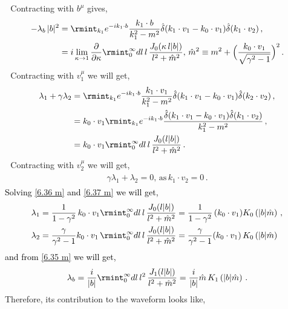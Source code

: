 \textbullet $\,\,$ Contracting with $b^\mu$ gives,
\begin{align}
    \begin{split}
        -\lambda_b \,|b|^2&=\rmint_{k_1} e^{-i k_1\cdot b} \frac{k_1\cdot b}{k_1^2-m^2}\hat\delta(k_1\cdot v_1-k_0\cdot v_1)\hat\delta(k_1\cdot v_2)\,,\\ &
        =i\lim_{\kappa\to 1}\frac{\partial}{\partial \kappa}\rmint_{0}^\infty dl\,l\,\frac{J_{0}(\kappa\,l|b|)}{l^2+\hat m^2},\,\hat m^2\equiv m^2+\Big(\frac{k_0\cdot v_1}{\sqrt{\gamma^2-1}}\Big)^2\,.\label{6.35 m}
    \end{split}
\end{align}
\textbullet $\,\,$ Contracting with $v_1^\mu$ we will get,
\begin{align}
    \begin{split}
        \lambda_1+\gamma\lambda_2&= \rmint_{k_1} e^{-i k_1\cdot b} \frac{k_1\cdot v_1}{k_1^2-m^2}\hat\delta(k_1\cdot v_1-k_0\cdot v_1)\hat\delta(k_2\cdot v_2)\,,\\ &
        =k_0\cdot v_1\rmint_{k_1}e^{-ik_1\cdot b}\frac{\hat\delta(k_1\cdot v_1-k_0\cdot v_1)\hat\delta(k_1\cdot v_2)}{k_1^2-m^2}\,,\\ &
        =k_0\cdot v_1\rmint_0^\infty dl\,l\,\frac{J_{0}(l|b|)}{l^2+\hat m^2
        }\,.\label{6.36 m}
    \end{split}
\end{align}
\textbullet $\,\,$ Contracting with $v_2^\mu$ we will get,
\begin{align}
    \begin{split}
        \gamma \lambda_1+\lambda_2=0,\,\textrm{as}\,k_1\cdot v_2=0\,.\label{6.37 m}
    \end{split}
\end{align}
\textcolor{black}{Solving \eqref{6.36 m} and \eqref{6.37 m} we will get,
\begin{align}
    \begin{split}
      &  \lambda_1=\frac{1}{1-\gamma^2}\,k_0\cdot v_1\rmint_0^\infty dl\,l\,\frac{J_{0}(l|b|)}{l^2+\hat m^2}=\frac{1}{1-\gamma^2}\,(k_0\cdot v_1)K_0\left(|b| \hat{m}\right)\,,\\ &
      \lambda_2=\frac{\gamma}{\gamma^2-1} k_0\cdot v_1\,\rmint_0^\infty dl\,l\,\frac{J_{0}(l|b|)}{l^2+\hat m^2}=\frac{\gamma}{\gamma^2-1} (k_0\cdot v_1)\,K_0\left(|b| \hat{m}\right)
    \end{split}
\end{align}
and from \eqref{6.35 m} we will get,
\begin{align}
    \lambda_b=\frac{i}{|b|}\rmint_0^\infty dl\,l^2\,\frac{J_1(l|b|)}{l^2+\hat m^2}=\frac{i}{|b|}\hat{m}\, K_1\left(|b| \hat{m}\right)\,.\label{6.19ab}
\end{align}
}
Therefore, its contribution to the waveform looks like,

